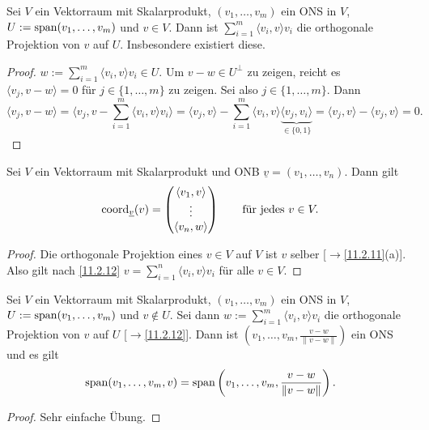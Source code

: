 \documentclass[../../main.tex]{subfiles}
\begin{document}

\begin{pro}\label{11.2.12}
Sei $V$ ein Vektorraum mit Skalarprodukt, $(v_1,\dots,v_m)$ ein ONS in $V$, $U:=\operatorname{span}(v_1,\dots,v_m)$ und $v\in V$. Dann ist
$\sum_{i=1}^m\langle v_i,v\rangle v_i$ die orthogonale Projektion von $v$ auf $U$. Insbesondere existiert diese.
\end{pro}

\begin{proof}
$w:=\sum_{i=1}^m\langle v_i,v\rangle v_i\in U$. Um $v-w\in U^\perp$ zu zeigen, reicht es $\langle v_j,v-w\rangle=0$ für $j\in\{1,\dots,m\}$ zu zeigen. Sei also $j\in\{1,\dots,m\}$.
Dann \[\langle v_j,v-w\rangle=\langle v_j,v-\sum_{i=1}^m\langle v_i,v\rangle v_i\rangle=\langle v_j,v\rangle-\sum_{i=1}^m\langle v_i,v\rangle
\underbrace{\langle v_j,v_i\rangle}_{\in\{0,1\}}=\langle v_j,v\rangle-\langle v_j,v\rangle=0.\]
\end{proof}

\begin{kor}\label{11.2.13}
Sei $V$ ein Vektorraum mit Skalarprodukt und ONB $\underline v=(v_1,\dots,v_n)$. Dann gilt
\[\operatorname{coord}_{\underline v}(v)=\begin{pmatrix}\langle v_1,v\rangle\\\vdots\\\langle v_n,w\rangle\end{pmatrix}\qquad\text{für jedes }v\in V.\]
\end{kor}

\begin{proof}
Die orthogonale Projektion eines $v\in V$ auf $V$ ist $v$ selber [$\to$\ref{11.2.11}(a)]. Also gilt nach \ref{11.2.12}
$v=\sum_{i=1}^n\langle v_i,v\rangle v_i$ für alle $v\in V$.
\end{proof}

\begin{pro}\label{11.2.14}
Sei $V$ ein Vektorraum mit Skalarprodukt, $(v_1,\dots,v_m)$ ein ONS in $V$, $U:=\operatorname{span}(v_1,\dots,v_m)$ und $v\not\in U$. Sei dann $w:=\sum_{i=1}^m\langle v_i,v\rangle v_i$
die orthogonale Projektion von $v$ auf $U$ {\rm[$\to$\ref{11.2.12}]}. Dann ist $(v_1,\dots,v_m,\frac{v-w}{\|v-w\|})$ ein ONS und es gilt 
\[\operatorname{span}(v_1,\dots,v_m,v)=\operatorname{span}\left(v_1,\dots,v_m,\frac{v-w}{\|v-w\|}\right).\]
\end{pro}

\begin{proof} Sehr einfache Übung.
\end{proof}
\end{document}
